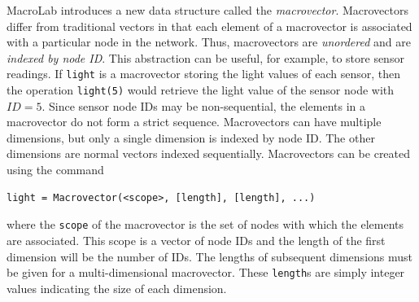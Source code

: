 MacroLab introduces a new data structure called the {\em macrovector}.
Macrovectors differ from traditional vectors in that each element of a
macrovector is associated with a particular node in the network.  Thus,
macrovectors are \emph{unordered} and are \emph{indexed by node ID}.  This
abstraction can be useful, for example, to store sensor readings. If {\tt light}
is a macrovector storing the light values of each sensor, then the operation
{\tt light(5)} would retrieve the light value of the sensor node with
$ID=5$. Since sensor node IDs may be non-sequential, the elements in a
macrovector do not form a strict sequence.  Macrovectors can have multiple
dimensions, but only a single dimension is indexed by node ID.  The other
dimensions are normal vectors indexed sequentially.  Macrovectors can be created
using the command \vspace{.1in}
\begin{center}
\ttfamily\small
\begin{verbatim}
light = Macrovector(<scope>, [length], [length], ...)
\end{verbatim}
\end{center}
\vspace{.1in} 
\noindent where the {\tt scope} of the macrovector is the set of nodes with
which the elements are associated.  This scope is a vector of node IDs and the
length of the first dimension will be the number of IDs.  The lengths of
subsequent dimensions must be given for a multi-dimensional macrovector. These
{\tt length}s are simply integer values indicating the size of each dimension.

